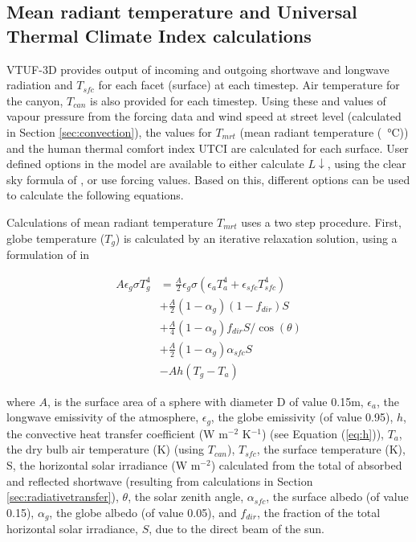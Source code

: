\documentclass[final,3p,times,authoryear]{elsarticle}
\begin{document}
\subsection{Mean radiant temperature and Universal Thermal Climate Index calculations}\label{sec:tmrtutci}

VTUF-3D provides output of incoming and outgoing shortwave and longwave radiation and $T_{sfc}$ for each facet (surface) at each timestep. Air temperature for the canyon, $T_{can}$ is also provided for each timestep. Using these and values of vapour pressure from the forcing data and wind speed at street level (calculated in Section \ref{sec:convection}), the values for $T_{mrt}$ (mean radiant temperature (\SI{}{\degreeCelsius})) and the human thermal comfort index UTCI are calculated for each surface. User defined options in the model are available to either calculate $L\downarrow$, using the clear sky formula of \cite{Prata1996}, or use forcing values. Based on this, different options can be used to calculate the following equations.


Calculations of mean radiant temperature $T_{mrt}$ uses a two step procedure. First, globe temperature ($T_{g}$) is calculated by an iterative relaxation solution, using a formulation of \cite{Liljegren2008} in  

\begin{equation}\label{eq:tg2}
\begin{split}
A\epsilon_{g}\sigma T_{g}^{4} &= \frac{A}{2} \epsilon_{g}\sigma( \epsilon_{a} T_{a}^{4} +  \epsilon_{sfc} T_{sfc}^{4} ) \\
&+ \frac{A}{2}( 1-\alpha_{g})(1-f_{dir})S  \\
&+ \frac{A}{4}( 1-\alpha_{g})f_{dir}S /\cos(\theta) \\
&+ \frac{A}{2}( 1-\alpha_{g})\alpha_{sfc}S \\
&- Ah(T_{g}-T_{a})   
\end{split}
\end{equation}

where $A$, is the surface area of a sphere with diameter D of value 0.15m,
$\epsilon_{a}$, the longwave emissivity of the atmosphere, 
$\epsilon_{g}$, the globe emissivity (of value 0.95), 
$h$, the convective heat transfer coefficient (W m$^{-2}$ K$^{-1}$) (see Equation (\ref{eq:h})), 
$T_{a}$, the dry bulb air temperature (K) (using $T_{can}$), 
$T_{sfc}$, the surface temperature (K), 
S, the horizontal solar irradiance (W m$^{-2}$) calculated from the total of absorbed and reflected shortwave (resulting from calculations in Section \ref{sec:radiativetransfer}), 
$\theta$, the solar zenith angle, 
$\alpha_{sfc}$, the surface albedo (of value 0.15),  
$\alpha_{g}$, the globe albedo (of value 0.05), and 
$f_{dir}$, the fraction of the total horizontal solar irradiance, $S$, due to the direct
beam of the sun. 
\end{document}
